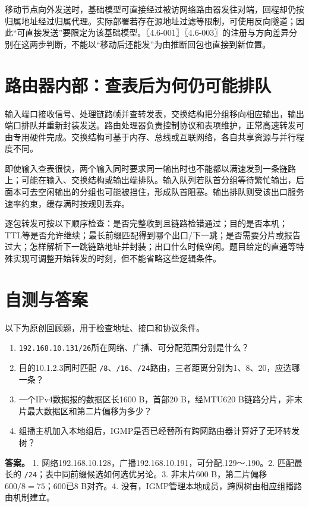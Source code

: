 移动节点向外发送时，基础模型可直接经过被访网络路由器发往对端，回程却仍按归属地址经过归属代理。实际部署若存在源地址过滤等限制，可使用反向隧道；因此``可直接发送''要限定为该基础模型。〖4.6-001〗〖4.6-003〗的注册与方向差异分别在这两步判断，不能以``移动后还能发''为由推断回包也直接到新位置。

\section{路由器内部：查表后为何仍可能排队}\label{cn-04-21}

输入端口接收信号、处理链路帧并查转发表，交换结构把分组移向相应输出，输出端口排队并重新封装发送。路由处理器负责控制协议和表项维护，正常高速转发可由专用硬件完成。交换结构可基于内存、总线或互联网络，各自共享资源与并行程度不同。

即使输入查表很快，两个输入同时要求同一输出时也不能都以满速发到一条链路上；可能在输入、交换结构或输出端排队。输入队列若队首分组等待繁忙输出，后面本可去空闲输出的分组也可能被挡住，形成队首阻塞。输出排队则受该出口服务速率约束，缓存满时按规则丢弃。

逐包转发可按以下顺序检查：是否完整收到且链路检错通过；目的是否本机；TTL等是否允许继续；最长前缀匹配得到哪个出口/下一跳；是否需要分片或报告过大；怎样解析下一跳链路地址并封装；出口什么时候空闲。题目给定的直通等特殊实现可调整开始转发的时刻，但不能省略这些逻辑条件。

\section{自测与答案}\label{cn-ch4-review}

以下为原创回顾题，用于检查地址、接口和协议条件。

\begin{enumerate}
\def\labelenumi{\arabic{enumi}.}
\tightlist
\item
  \allowbreak{}\texttt{192.168.10.131/26}所在网络、广播、可分配范围分别是什么？
\item
  目的10.1.2.3同时匹配 \allowbreak{}\texttt{/8}、\allowbreak{}\texttt{/16}、\allowbreak{}\texttt{/24}路由，三者距离分别为1、8、20，应选哪一条？
\item
  一个IPv4数据报的数据区长1600 B，首部20 B，经MTU620 B链路分片，非末片最大数据区和第二片偏移为多少？
\item
  组播主机加入本地组后，IGMP是否已经替所有跨网路由器计算好了无环转发树？
\end{enumerate}

\textbf{答案。} 1. 网络192.168.10.128，广播192.168.10.191，可分配.129～.190。2. 匹配最长的 \allowbreak{}\texttt{/24}；表中同前缀候选如何选优另论。3. 非末片600 B，第二片偏移 \(600/8=75\)；600已8 B对齐。4. 没有，IGMP管理本地成员，跨网树由相应组播路由机制建立。

